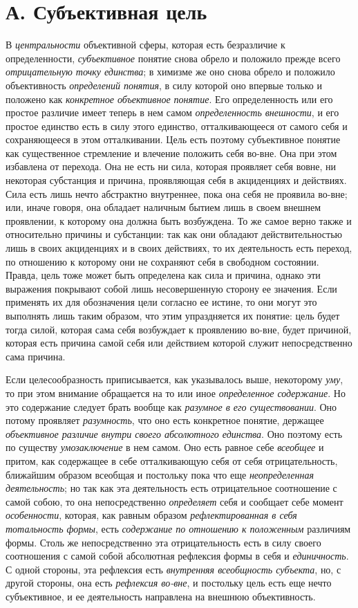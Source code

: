{{\section[А. Субъективная цель]{А. Субъективная цель}
В {\em центральности}
объективной сферы, которая есть безразличие к определенности,
{\em субъективное}
понятие снова обрело и положило прежде всего
{\em отрицательную точку единства};
в химизме же оно снова обрело и положило объективность
{\em определений понятия},
в силу которой оно впервые только и положено как
{\em конкретное объективное понятие}.
Его определенность или его простое различие имеет теперь в
нем самом {\em определенность
внешности}, и его простое единство есть в силу этого
единство, отталкивающееся от самого себя и сохраняющееся в этом
отталкивании. Цель есть поэтому субъективное понятие как существенное
стремление и влечение положить себя во-вне. Она при этом избавлена от
перехода. Она не есть ни сила, которая проявляет себя вовне, ни некоторая
субстанция и причина, проявляющая себя в акциденциях и действиях. Сила есть
лишь нечто абстрактно внутреннее, пока она себя не проявила во-вне; или,
иначе говоря, она обладает наличным бытием лишь в своем внешнем проявлении,
к которому она должна быть возбуждена. То же самое верно также и
относительно причины и субстанции: так как они обладают действительностью
лишь в своих акциденциях и в своих действиях, то их деятельность есть
переход, по отношению к которому они не сохраняют себя в свободном
состоянии. Правда, цель тоже может быть определена как сила и причина,
однако эти выражения покрывают собой лишь несовершенную сторону ее
значения. Если применять их для обозначения цели согласно ее истине, то они
могут это выполнять лишь таким образом, что этим упраздняется их понятие:
цель будет тогда силой, которая сама себя возбуждает к проявлению во-вне,
будет причиной, которая есть причина самой себя или действием которой
служит непосредственно сама причина.

Если целесообразность приписывается, как указывалось выше,
некоторому {\em уму}, то
при этом внимание обращается на то или иное
{\em определенное содержание}.
Но это содержание следует брать вообще как
{\em разумное в его существовании}.
Оно потому проявляет
{\em разумность}, что оно
есть конкретное понятие, держащее
{\em объективное различие внутри своего
абсолютного единства}. Оно поэтому есть по существу
{\em умозаключение} в нем
самом. Оно есть равное себе
{\em всеобщее} и притом,
как содержащее в себе отталкивающую себя от себя
отрицательность, ближайшим образом всеобщая и постольку пока
что еще {\em неопределенная
деятельность}; но так как эта деятельность есть
отрицательное соотношение с самой собою, то она непосредственно
{\em определяет} себя и
сообщает себе момент {\em особенности},
которая, как равным образом
{\em рефлектированная в себя тотальность
формы}, есть
{\em содержание по отношению к
положенным} различиям формы. Столь же непосредственно эта
отрицательность есть в силу своего соотношения с самой собой абсолютная
рефлексия формы в себя и
{\em единичность}. С
одной стороны, эта рефлексия есть
{\em внутренняя всеобщность субъекта},
но, с другой стороны, она есть
{\em рефлексия во-вне}, и
постольку цель есть еще нечто субъективное, и ее деятельность направлена на
внешнюю объективность.

}}
